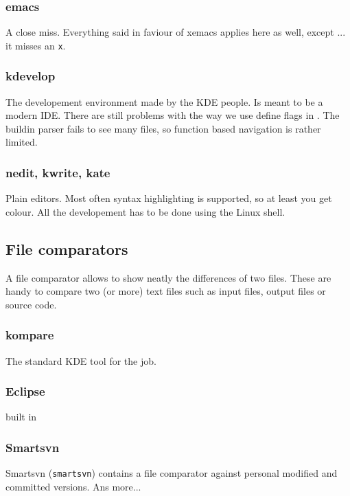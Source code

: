 \subsubsection{emacs}

A close miss. Everything said in faviour of xemacs applies here as
well, except ... it misses an \texttt{x}.


\subsubsection{kdevelop}

The developement environment made by the KDE people. Is meant to be
a modern IDE. There are still problems with the way we use define
flags in \ccarat{}. The buildin parser fails to see many files, so
function based navigation is rather limited.


\subsubsection{nedit, kwrite, kate}

Plain editors. Most often syntax highlighting is supported, so at
least you get colour. All the developement has to be done using the
Linux shell.


\subsection{File comparators}

A file comparator allows to show neatly the differences of two files. These
are handy to compare two (or more) text files such as input files, output
files or source code.

\subsubsection{kompare}

The standard KDE tool for the job.

\subsubsection{Eclipse}

built in

\subsubsection{Smartsvn}

Smartsvn (\texttt{smartsvn}) contains a file comparator against personal
modified and committed versions. Ans more...

